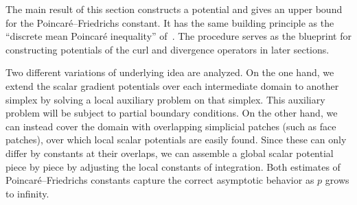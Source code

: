 \documentclass[10pt,a4paper]{article}
\begin{document}




The main result of this section constructs a potential and gives an upper bound for the Poincar\'e--Friedrichs constant.  
It has the same building principle as the ``discrete mean Poincar\'e inequality'' of~\cite[Lemma~3.7]{Eym_Gal_Her_00}.
The procedure serves as the blueprint for constructing potentials of the curl and divergence operators in later sections. 

Two different variations of underlying idea are analyzed. 
On the one hand, we extend the scalar gradient potentials over each intermediate domain to another simplex by solving a local auxiliary problem on that simplex. This auxiliary problem will be subject to partial boundary conditions. 
On the other hand, we can instead cover the domain with overlapping simplicial patches (such as face patches), over which local scalar potentials are easily found. Since these can only differ by constants at their overlaps, we can assemble a global scalar potential piece by piece by adjusting the local constants of integration. 
Both estimates of Poincar\'e--Friedrichs constants capture the correct asymptotic behavior as $p$ grows to infinity.
\end{document}
